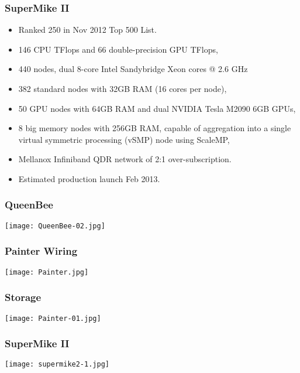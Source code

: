 \documentclass[slidestop,mathserif,compress,xcolor=svgnames,table]{beamer}
\newenvironment{eblock}[0]
{
\begin{beamerboxesrounded}[upper=uppercol2,lower=lowercol2,shadow=true]}
{\end{beamerboxesrounded}}
\begin{document}
\begin{frame}
  \frametitle{\small SuperMike II}
  \begin{eblock}{}
    \begin{itemize}
      \item Ranked 250 in Nov 2012 Top 500 List.
      \item 146 CPU TFlops and 66 double-precision GPU TFlops,
      \item 440 nodes, dual 8-core  Intel Sandybridge Xeon cores @ 2.6 GHz
      \item 382 standard nodes with 32GB RAM (16 cores per node),
      \item 50 GPU nodes with 64GB RAM and dual NVIDIA Tesla M2090 6GB GPUs,
      \item 8 big memory nodes with 256GB RAM, capable of aggregation into a single virtual symmetric processing (vSMP) node using ScaleMP,
      \item Mellanox Infiniband QDR network of 2:1 over-subscription.
      \item Estimated production launch Feb 2013.
    \end{itemize}
  \end{eblock}
\end{frame}

\begin{frame}
  \frametitle{\small QueenBee}
  \texttt{[image: QueenBee-02.jpg]}
\end{frame}
\begin{frame}
  \frametitle{\small Painter Wiring}
  \texttt{[image: Painter.jpg]}
\end{frame}
\begin{frame}
  \frametitle{\small Storage}
  \texttt{[image: Painter-01.jpg]}
\end{frame}
\begin{frame}
  \frametitle{\small SuperMike II}
  \texttt{[image: supermike2-1.jpg]}
\end{frame}
\end{document}
